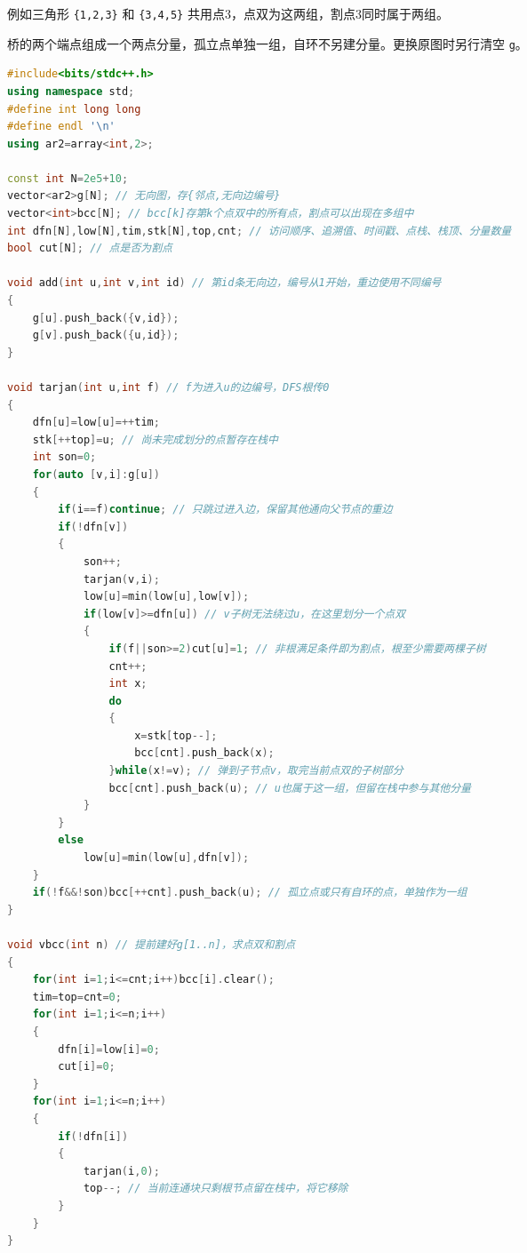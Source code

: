 \documentclass[10pt,landscape,a4paper]{article}
\begin{document}
\begin{multicols*}{3}
例如三角形 \texttt{\{\allowbreak{}1\allowbreak{},\allowbreak{}2\allowbreak{},\allowbreak{}3\allowbreak{}\}} 和 \texttt{\{\allowbreak{}3\allowbreak{},\allowbreak{}4\allowbreak{},\allowbreak{}5\allowbreak{}\}} 共用点3，点双为这两组，割点3同时属于两组。\par
桥的两个端点组成一个两点分量，孤立点单独一组，自环不另建分量。更换原图时另行清空 \texttt{g}。\par
\par{}\par
\begin{lstlisting}[language=C++]
#include<bits/stdc++.h>
using namespace std;
#define int long long
#define endl '\n'
using ar2=array<int,2>;

const int N=2e5+10;
vector<ar2>g[N]; // 无向图，存{邻点,无向边编号}
vector<int>bcc[N]; // bcc[k]存第k个点双中的所有点，割点可以出现在多组中
int dfn[N],low[N],tim,stk[N],top,cnt; // 访问顺序、追溯值、时间戳、点栈、栈顶、分量数量
bool cut[N]; // 点是否为割点

void add(int u,int v,int id) // 第id条无向边，编号从1开始，重边使用不同编号
{
    g[u].push_back({v,id});
    g[v].push_back({u,id});
}

void tarjan(int u,int f) // f为进入u的边编号，DFS根传0
{
    dfn[u]=low[u]=++tim;
    stk[++top]=u; // 尚未完成划分的点暂存在栈中
    int son=0;
    for(auto [v,i]:g[u])
    {
        if(i==f)continue; // 只跳过进入边，保留其他通向父节点的重边
        if(!dfn[v])
        {
            son++;
            tarjan(v,i);
            low[u]=min(low[u],low[v]);
            if(low[v]>=dfn[u]) // v子树无法绕过u，在这里划分一个点双
            {
                if(f||son>=2)cut[u]=1; // 非根满足条件即为割点，根至少需要两棵子树
                cnt++;
                int x;
                do
                {
                    x=stk[top--];
                    bcc[cnt].push_back(x);
                }while(x!=v); // 弹到子节点v，取完当前点双的子树部分
                bcc[cnt].push_back(u); // u也属于这一组，但留在栈中参与其他分量
            }
        }
        else
            low[u]=min(low[u],dfn[v]);
    }
    if(!f&&!son)bcc[++cnt].push_back(u); // 孤立点或只有自环的点，单独作为一组
}

void vbcc(int n) // 提前建好g[1..n]，求点双和割点
{
    for(int i=1;i<=cnt;i++)bcc[i].clear();
    tim=top=cnt=0;
    for(int i=1;i<=n;i++)
    {
        dfn[i]=low[i]=0;
        cut[i]=0;
    }
    for(int i=1;i<=n;i++)
    {
        if(!dfn[i])
        {
            tarjan(i,0);
            top--; // 当前连通块只剩根节点留在栈中，将它移除
        }
    }
}
\end{lstlisting}

\end{multicols*}
\end{document}
